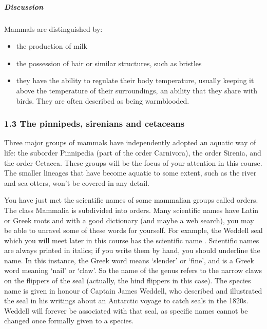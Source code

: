 \documentclass[letterpaper,10pt,english]{sphinxmanual}
\begin{document}
\subparagraph{Discussion}
\label{\detokenize{content/session_00/Part_00_01:id3}}
Mammals are distinguished by:
\begin{itemize}
\item {} 
the production of milk

\item {} 
the possession of hair or similar structures, such as bristles

\item {} 
they have the ability to regulate their body temperature, usually keeping it above the temperature of their surroundings, an ability that they share with birds. They are often described as being warm\sphinxhyphen{}blooded.

\end{itemize}


\subsubsection{1.3 The pinnipeds, sirenians and cetaceans}
\label{\detokenize{content/session_00/Part_00_01:1.3-The-pinnipeds,-sirenians-and-cetaceans}}
Three major groups of mammals have independently adopted an aquatic way of life: the suborder Pinnipedia (part of the order Carnivora), the order Sirenia, and the order Cetacea. These groups will be the focus of your attention in this course. The smaller lineages that have become aquatic to some extent, such as the river and sea otters, won’t be covered in any detail.

You have just met the scientific names of some mammalian groups called orders. The class Mammalia is sub\sphinxhyphen{}divided into orders. Many scientific names have Latin or Greek roots and with a good dictionary (and maybe a web search), you may be able to unravel some of these words for yourself. For example, the Weddell seal which you will meet later in this course has the scientific name . Scientific names are always printed in italics; if you write them by hand, you should
underline the name. In this instance, the Greek word  means ‘slender’ or ‘fine’, and  is a Greek word meaning ‘nail’ or ‘claw’. So the name of the genus  refers to the narrow claws on the flippers of the seal (actually, the hind flippers in this case). The species name  is given in honour of Captain James Weddell, who described and illustrated the seal in his writings about an Antarctic voyage to catch seals in the 1820s. Weddell will forever be associated
with that seal, as specific names cannot be changed once formally given to a species.
\end{document}
